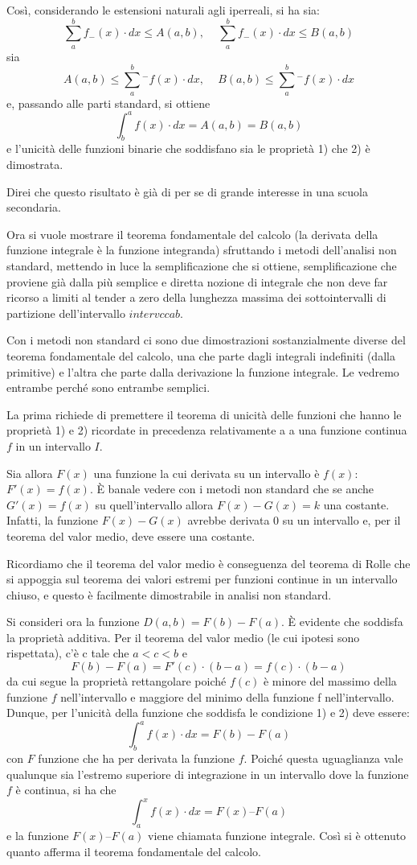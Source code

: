 Così, 
considerando le estensioni naturali agli iperreali, si ha sia:
\[\sum_a^b f_{-}(x) \cdot dx \le A(a,b) \text{, } \quad
  \sum_a^b f_{-}(x) \cdot dx \le B(a,b)\]
sia 
\[A(a,b) \le \sum_a^b {}^{-}f(x) \cdot dx \text{, } \quad
  B(a,b) \le \sum_a^b {}^{-}f(x) \cdot dx\] 
e, passando alle parti standard, si ottiene 
\[\int_b^a f(x) \cdot dx = A(a,b) = B(a,b)\]
e l'unicità delle funzioni binarie che soddisfano sia le proprietà 1) che 2) 
è dimostrata. 

Direi che questo risultato è già di per se di grande interesse in una scuola 
secondaria. 

Ora si vuole mostrare il teorema fondamentale del calcolo (la derivata della 
funzione integrale è la funzione integranda) sfruttando i 
metodi dell'analisi non standard, mettendo in luce la semplificazione che si 
ottiene, semplificazione che proviene già dalla più semplice e diretta 
nozione di integrale che non deve far ricorso a limiti al tender a zero della 
lunghezza massima dei sottointervalli di partizione dell'intervallo 
\(intervcc{a}{b}\). 

Con i metodi non standard ci sono due dimostrazioni sostanzialmente diverse 
del teorema fondamentale del calcolo, una che parte dagli integrali indefiniti 
(dalla primitive) e l'altra che parte dalla derivazione la funzione integrale. 
Le vedremo entrambe perché sono entrambe semplici. 

La prima richiede di 
premettere il teorema di unicità delle funzioni che hanno le proprietà 1) e 
2) ricordate in precedenza relativamente a a una funzione continua \(f\) in 
un intervallo \(I\). 

Sia allora \(F(x)\) una funzione la cui derivata su un intervallo è 
\(f(x)\):  
\(F'(x) = f(x)\). 
È banale vedere con i metodi non standard che se anche 
\(G'(x) = f(x)\) 
su quell'intervallo allora \(F(x) - G(x) = k\) una costante. 
Infatti, la funzione 
\(F(x) - G(x)\) avrebbe derivata 0 su un intervallo e, per il teorema 
del valor medio, deve essere una costante. 

Ricordiamo che il teorema del valor medio è conseguenza del teorema
di Rolle che si appoggia sul teorema dei valori estremi per funzioni continue 
in un intervallo chiuso, e questo è facilmente dimostrabile in analisi non 
standard. 

Si consideri ora la funzione 
\(D(a,b) = F(b)-F(a)\). 
È evidente che soddisfa la proprietà additiva. Per il teorema 
del valor medio (le cui ipotesi sono rispettata), c'è c tale che 
\(a < c < b\) 
e 
\[F(b)-F(a) = F'(c)\cdot(b - a) = f(c)\cdot(b - a)\]
da cui segue la proprietà rettangolare poiché \(f(c)\) è minore del massimo 
della funzione \(f\) 
nell'intervallo e maggiore del minimo della funzione f nell'intervallo.
Dunque, 
per l'unicità della funzione che soddisfa le condizione 1) e 2) deve essere:
\[\int_b^a f(x) \cdot dx = F(b)-F(a)\]
con \(F\) funzione che ha per derivata la funzione \(f\). 
Poiché questa uguaglianza vale qualunque sia l'estremo superiore di 
integrazione in un intervallo dove la funzione \(f\) è continua, si ha che
\[\int_a^x f(x) \cdot dx = F(x) – F(a)\]
e la funzione \(F(x) – F(a)\) viene chiamata funzione integrale.
Così si è ottenuto quanto afferma il teorema fondamentale del
calcolo.

